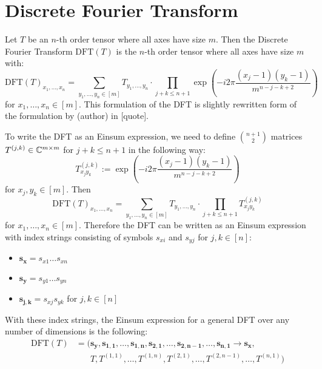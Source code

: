 \section{Discrete Fourier Transform}
Let $T$ be an $n$-th order tensor where all axes have size $m$.
Then the Discrete Fourier Transform $\text{DFT}(T)$ is the $n$-th order tensor where all axes have size $m$ with:
$$\text{DFT}(T)_{x_1,\dots,x_n} = \sum\limits_{y_1,\dots,y_n \in [m]} T_{y_1, \dots, y_n} \cdot \prod\limits_{j + k \leq n + 1} \exp\left(-i2\pi \frac{(x_j - 1) (y_k - 1)}{m^{n - j - k + 2}}\right)$$
for $x_1,\dots,x_n \in [m]$.
This formulation of the DFT is slightly rewritten form of the formulation by (author) in [quote].

To write the DFT as an Einsum expression, we need to define $\binom{n + 1}{2}$ matrices $T^{(j,k)} \in \mathbb{C}^{m \times m}$ for $j + k \leq n + 1$ in the following way:
$$T^{(j,k)}_{x_j y_k} := \exp\left(-i2\pi \frac{(x_j - 1) (y_k - 1)}{m^{n - j - k + 2}}\right)$$
for $x_j, y_k \in [m]$.
Then
$$\text{DFT}(T)_{x_1,\dots,x_n} = \sum\limits_{y_1,\dots,y_n \in [m]} T_{y_1, \dots, y_n} \cdot \prod\limits_{j + k \leq n + 1} T^{(j,k)}_{x_j y_k}$$
for $x_1,\dots,x_n \in [m]$.
Therefore the DFT can be written as an Einsum expression with index strings consisting of symbols $s_{xi}$ and $s_{yj}$ for $j,k \in [n]$:
\begin{itemize}
    \item $\bm{s_x} = s_{x1}\dots s_{x n}$
    \item $\bm{s_y} = s_{y1}\dots s_{y n}$
    \item $\bm{s_{j,k}} = s_{xj} s_{yk}$ for $j,k \in [n]$
\end{itemize}
With these index strings, the Einsum expression for a general DFT over any number of dimensions is the following:
\begin{align*}
    \text{DFT}(T) & = (\bm{s_y}, \bm{s_{1,1}}, \dots, \bm{s_{1,n}}, \bm{s_{2,1}}, \dots, \bm{s_{2,n - 1}}, \dots, \bm{s_{n, 1}} \rightarrow \bm{s_x}, \\
                  & \phantom{{}=(} T, T^{(1,1)}, \dots, T^{(1, n)}, T^{(2,1)}, \dots, T^{(2, n-1)}, \dots, T^{(n, 1)})
\end{align*}

